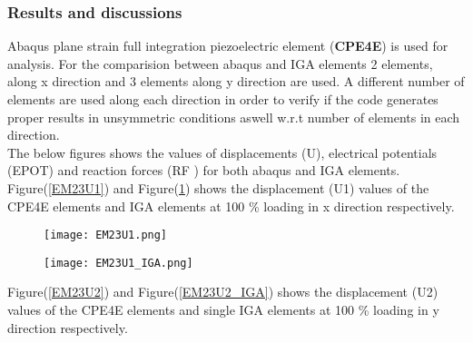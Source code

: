 \documentclass[11pt]{article}
\begin{document}
\subsubsection{Results and discussions}
Abaqus plane strain full integration piezoelectric element (\textbf{CPE4E}) is used for analysis. For the comparision between abaqus and IGA elements 2 elements, along x direction and 3 elements along y direction are used. A different number of elements are used along each direction in order to verify if the code generates proper results in unsymmetric conditions aswell w.r.t number of elements in each direction.\\
 The below figures shows the values of displacements (U), electrical potentials (EPOT) and reaction forces (RF ) for both abaqus and IGA elements.\\
Figure(\ref{EM23U1}) and Figure(\ref{EM23U1_IGA}) shows the displacement (U1) values of the CPE4E elements and IGA elements at 100 \% loading in x direction respectively. \\
\begin{figure}[H]
	\centering
	\begin{minipage}{.5\textwidth}
		\centering
		\texttt{[image: EM23U1.png]}
		\label{EM23U1}
	\end{minipage}%
	\begin{minipage}{.5\textwidth}
		\centering
		\texttt{[image: EM23U1\_IGA.png]}
		\label{EM23U1_IGA}
	\end{minipage}
\end{figure}
\noindent
Figure(\ref{EM23U2}) and Figure(\ref{EM23U2_IGA}) shows the displacement (U2) values of the CPE4E elements and single IGA elements at 100 \% loading in y direction respectively. \\
\begin{comment}
\begin{figure}[H]
\begin{center}
\texttt{[image: xyz.png]} 
\caption{\\CPE4 Element U1}\label{xyz}
\end{center}	
\end{figure}

\begin{figure}[H]
\begin{center}
\texttt{[image: Figure\_1.png]} 
\caption{\\IGA Element U1}\label{Figure_1}
\end{center}	
\end{figure}
\end{comment}
\end{document}
